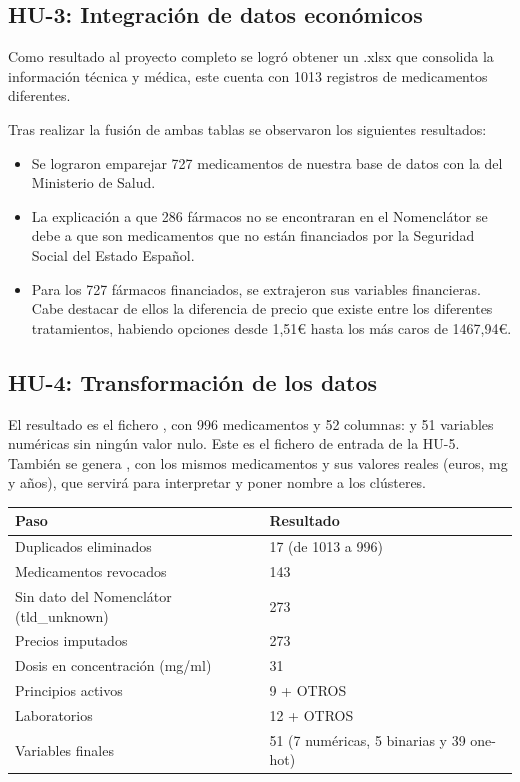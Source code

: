 \documentclass[11pt,a4paper]{article}
\begin{document}
\subsection{HU-3: Integración de datos económicos}
Como resultado al proyecto completo se logró obtener un .xlsx que consolida la información
técnica y médica, este cuenta con 1013 registros de medicamentos diferentes.

Tras realizar la fusión de ambas tablas se observaron los siguientes resultados:
\begin{itemize}
  \item Se lograron emparejar 727 medicamentos de nuestra base de datos con la del
        Ministerio de Salud.
  \item La explicación a que 286 fármacos no se encontraran en el Nomenclátor se debe a que
        son medicamentos que no están financiados por la Seguridad Social del Estado
        Español.
  \item Para los 727 fármacos financiados, se extrajeron sus variables financieras. Cabe
        destacar de ellos la diferencia de precio que existe entre los diferentes tratamientos,
        habiendo opciones desde 1,51€ hasta los más caros de 1467,94€.
\end{itemize}

\subsection{HU-4: Transformación de los datos}
El resultado es el fichero , con 996 medicamentos y 52
columnas:  y 51 variables numéricas sin ningún valor nulo. Este es el fichero de entrada
de la HU-5. También se genera , con los mismos
medicamentos y sus valores reales (euros, mg y años), que servirá para interpretar y poner
nombre a los clústeres.

\begin{table}[H]
  \centering
  \begin{tabular}{lp{5.5cm}}
    \toprule
    \textbf{Paso} & \textbf{Resultado} \\
    \midrule
    Duplicados eliminados                     & 17 (de 1013 a 996) \\
    Medicamentos revocados                    & 143 \\
    Sin dato del Nomenclátor (tld\_unknown)   & 273 \\
    Precios imputados                         & 273 \\
    Dosis en concentración (mg/ml)            & 31 \\
    Principios activos                        & 9 + OTROS \\
    Laboratorios                              & 12 + OTROS \\
    Variables finales                         & 51 (7 numéricas, 5 binarias y 39 one-hot) \\
    \bottomrule
  \end{tabular}
\end{table}
\end{document}
